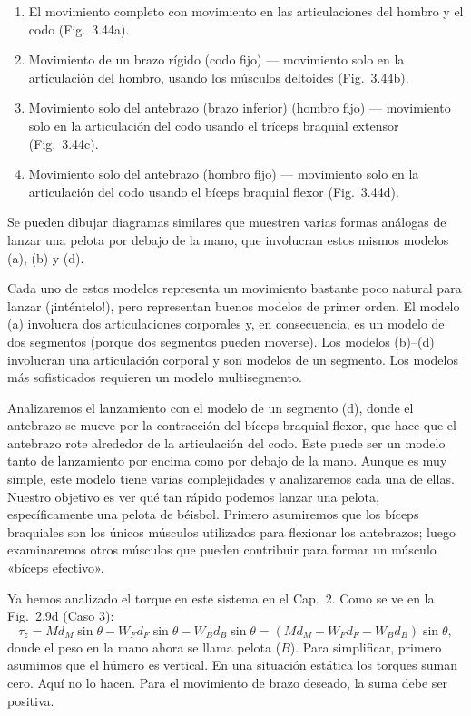 \documentclass[12pt]{book}
\begin{document}

\begin{enumerate}[label=(\alph*)]
  \item El movimiento completo con movimiento en las articulaciones del hombro y el codo (Fig.~3.44a).
  \item Movimiento de un brazo rígido (codo fijo) --- movimiento solo en la articulación del hombro, usando los músculos deltoides (Fig.~3.44b).
  \item Movimiento solo del antebrazo (brazo inferior) (hombro fijo) --- movimiento solo en la articulación del codo usando el tríceps braquial extensor (Fig.~3.44c).
  \item Movimiento solo del antebrazo (hombro fijo) --- movimiento solo en la articulación del codo usando el bíceps braquial flexor (Fig.~3.44d).
\end{enumerate}

Se pueden dibujar diagramas similares que muestren varias formas análogas de lanzar una pelota por debajo de la mano, que involucran estos mismos modelos (a), (b) y (d).

Cada uno de estos modelos representa un movimiento bastante poco natural para lanzar (¡inténtelo!), pero representan buenos modelos de primer orden. El modelo (a) involucra dos articulaciones corporales y, en consecuencia, es un modelo de dos segmentos (porque dos segmentos pueden moverse). Los modelos (b)--(d) involucran una articulación corporal y son modelos de un segmento. Los modelos más sofisticados requieren un modelo multisegmento.

Analizaremos el lanzamiento con el modelo de un segmento (d), donde el antebrazo se mueve por la contracción del bíceps braquial flexor, que hace que el antebrazo rote alrededor de la articulación del codo. Este puede ser un modelo tanto de lanzamiento por encima como por debajo de la mano. Aunque es muy simple, este modelo tiene varias complejidades y analizaremos cada una de ellas. Nuestro objetivo es ver qué tan rápido podemos lanzar una pelota, específicamente una pelota de béisbol. Primero asumiremos que los bíceps braquiales son los únicos músculos utilizados para flexionar los antebrazos; luego examinaremos otros músculos que pueden contribuir para formar un músculo «bíceps efectivo».

Ya hemos analizado el torque en este sistema en el Cap.~2. Como se ve en la Fig.~2.9d (Caso 3):
\begin{equation}
\tau_z = M d_M \sin\theta - W_F d_F \sin\theta - W_B d_B \sin\theta
       = (M d_M - W_F d_F - W_B d_B)\sin\theta,
\label{eq:3.67}
\end{equation}
donde el peso en la mano ahora se llama pelota ($B$). Para simplificar, primero asumimos que el húmero es vertical. En una situación estática los torques suman cero. Aquí no lo hacen. Para el movimiento de brazo deseado, la suma debe ser positiva.
\end{document}
